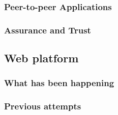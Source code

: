 



    
    \subsubsection{Peer-to-peer Applications}


    \subsubsection{Assurance and Trust}




  \subsection{Web platform} 


    \subsubsection{What has been happening}

    \subsubsection{Previous attempts}
